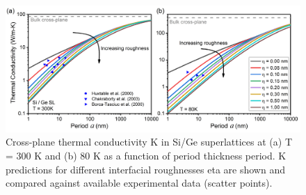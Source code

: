\begin{figure}[hbt]
  \centering \includegraphics[width=1.0\textwidth]{figures/ch6/Fig2.jpg}
  \caption{Cross-plane thermal conductivity \gls{K} in Si/Ge superlattices at (a) \gls{T} = 300 K and (b) 80 K as a function of period thickness \gls{period}. \gls{K} predictions for different interfacial roughnesses \gls{eta} are shown and compared against available experimental data (scatter points).}
  \label{fig:ch6-2}
\end{figure}
